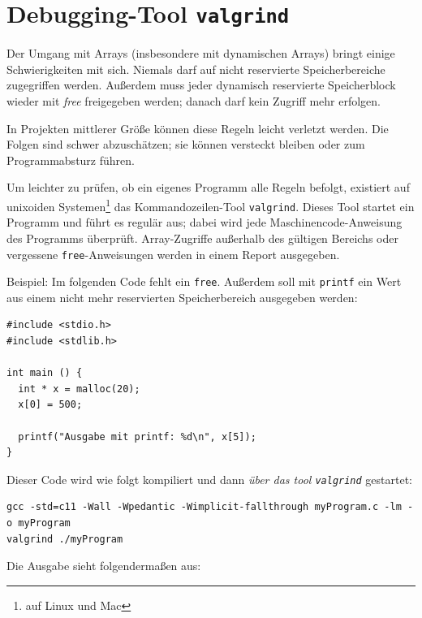 \section{Debugging-Tool \texttt{valgrind}}
Der Umgang mit Arrays (insbesondere mit dynamischen Arrays) bringt einige Schwierigkeiten mit sich. Niemals darf auf nicht reservierte Speicherbereiche zugegriffen werden. Außerdem muss jeder dynamisch reservierte Speicherblock wieder mit \emph{free} freigegeben werden; danach darf kein Zugriff mehr erfolgen.

In Projekten mittlerer Größe können diese Regeln leicht verletzt werden. Die Folgen sind schwer abzuschätzen; sie können versteckt bleiben oder zum Programmabsturz führen.

Um leichter zu prüfen, ob ein eigenes Programm alle Regeln befolgt, existiert auf unixoiden Systemen\footnote{\ie auf Linux und Mac} das Kommandozeilen-Tool \texttt{valgrind}. Dieses Tool startet ein Programm und führt es regulär aus; dabei wird jede Maschinencode-Anweisung des Programms überprüft. Array-Zugriffe außerhalb des gültigen Bereichs oder vergessene \texttt{free}-Anweisungen werden in einem Report ausgegeben.

Beispiel: Im folgenden Code fehlt ein \texttt{free}. Außerdem soll mit \texttt{printf} ein Wert aus einem nicht mehr reservierten Speicherbereich ausgegeben werden:

\begin{warnbox}[Beispiel: Fehlerhafter Code mit dynamischer Speicherverwaltung, leftupper=7mm]
\begin{verbatim}
#include <stdio.h>
#include <stdlib.h>

int main () {
  int * x = malloc(20);
  x[0] = 500;

  printf("Ausgabe mit printf: %d\n", x[5]);
}
\end{verbatim}
\end{warnbox}

Dieser Code wird wie folgt kompiliert und dann \emph{über das tool \texttt{valgrind}} gestartet:

\begin{cmdbox}
\begin{verbatim}
gcc -std=c11 -Wall -Wpedantic -Wimplicit-fallthrough myProgram.c -lm -o myProgram
valgrind ./myProgram
\end{verbatim}
\end{cmdbox}

Die Ausgabe sieht folgendermaßen aus:


